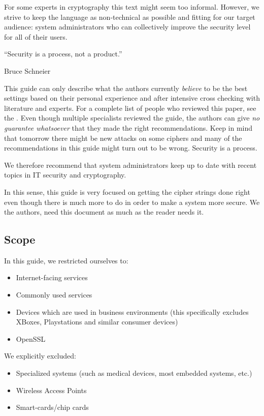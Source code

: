 For some experts in cryptography this text might seem too informal. However, we
strive to keep the language as non-technical as possible and fitting for our
target audience: system administrators who can collectively improve the
security level for all of their users. 



\epigraph{``Security is a process, not a product.''}{Bruce Schneier}

This guide can only describe what the authors currently
\emph{believe} to be the best settings based on their personal experience and
after intensive cross checking with literature and experts. For a complete list
of people who reviewed this paper, see the .
Even though multiple specialists reviewed the guide, the authors can give
\emph{no guarantee whatsoever} that they made the right recommendations. Keep in
mind that tomorrow there might be new attacks on some ciphers and many of the
recommendations in this guide might turn out to be wrong. Security is a
process.


We therefore recommend that system administrators keep up to date with recent
topics in IT security and cryptography. 


In this sense, this guide is very focused on getting the cipher strings done
right even though there is much more to do in order to make a system more
secure.  We the authors, need this document as much as the reader needs it.

\subsection*{Scope}
\label{section:Scope}

In this guide, we restricted ourselves to:
\begin{itemize}
\item Internet-facing services
\item Commonly used services
\item Devices which are used in business environments (this specifically excludes XBoxes, Playstations and similar consumer devices)
\item OpenSSL 
\end{itemize}

We explicitly excluded:
\begin{itemize}
\item Specialized systems (such as medical devices, most embedded systems, etc.)
\item Wireless Access Points
\item Smart-cards/chip cards
\end{itemize}


